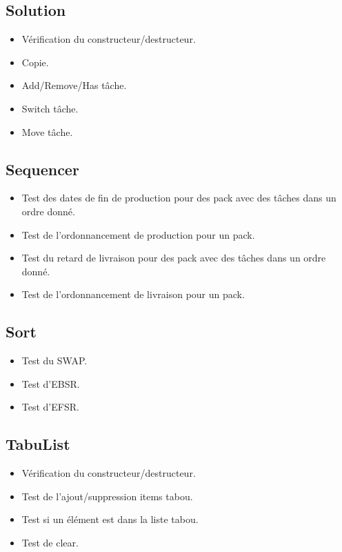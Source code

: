 \documentclass[hideweeklyreports]{polytech/polytech}
\begin{document}
			\subsection{Solution}
				\begin{itemize}
					\item Vérification du constructeur/destructeur.
					\item Copie.
					\item Add/Remove/Has tâche.
					\item Switch tâche.
					\item Move tâche.
				\end{itemize}
				
			\subsection{Sequencer}
				\begin{itemize}
					\item Test des dates de fin de production pour des pack avec des tâches dans un ordre donné.
					\item Test de l'ordonnancement de production pour un pack.
					\item Test du retard de livraison pour des pack avec des tâches dans un ordre donné.
					\item Test de l'ordonnancement de livraison pour un pack.
				\end{itemize}
				
			\subsection{Sort}
				\begin{itemize}
					\item Test du SWAP.
					\item Test d'EBSR.
					\item Test d'EFSR.
				\end{itemize}
				
			\subsection{TabuList}
				\begin{itemize}
					\item Vérification du constructeur/destructeur.
					\item Test de l'ajout/suppression items tabou.
					\item Test si un élément est dans la liste tabou.
					\item Test de clear.
				\end{itemize}
				
\end{document}
